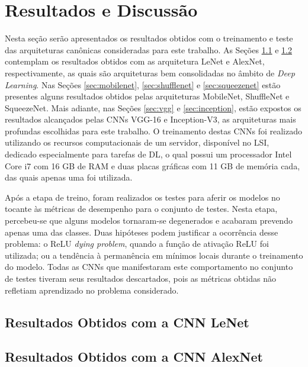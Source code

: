 
\chapter{Resultados e Discussão} \label{cap:resultados}

Nesta seção serão apresentados os resultados obtidos com o treinamento e teste das arquiteturas canônicas consideradas para este trabalho. As Seções \ref{sec:lenet} e \ref{sec:alexnet} contemplam os resultados obtidos com as arquitetura LeNet e AlexNet, respectivamente, as quais são arquiteturas bem consolidadas no âmbito de \emph{Deep Learning}. Nas Seções \ref{sec:mobilenet}, \ref{sec:shufflenet} e \ref{sec:squeezenet} estão presentes alguns resultados obtidos pelas arquiteturas MobileNet, ShuffleNet e SqueezeNet. Mais adiante, nas Seções \ref{sec:vgg} e \ref{sec:inception}, estão expostos os resultados alcançados pelas CNNs VGG-16 e Inception-V3, as arquiteturas mais profundas escolhidas para este trabalho. O treinamento destas CNNs foi realizado utilizando os recursos computacionais de um servidor, disponível no LSI, dedicado especialmente para tarefas de DL, o qual possui um processador Intel Core i7 com 16 GB de RAM e duas placas gráficas com 11 GB de memória cada, das quais apenas uma foi utilizada.

Após a etapa de treino, foram realizados os testes para aferir os modelos no tocante às métricas de desempenho para o conjunto de testes. Nesta etapa, percebeu-se que alguns modelos tornaram-se degenerados e acabaram prevendo apenas uma das classes. Duas hipóteses podem justificar a ocorrência desse problema: o ReLU \emph{dying problem}, quando a função de ativação ReLU foi utilizada; ou a tendência à permanência em mínimos locais durante o treinamento do modelo. Todas as CNNs que manifestaram este comportamento no conjunto de testes tiveram seus resultados descartados, pois as métricas obtidas não refletiam aprendizado no problema considerado.


\section{Resultados Obtidos com a CNN LeNet}
\label{sec:lenet}


\section{Resultados Obtidos com a CNN AlexNet}
\label{sec:alexnet}


